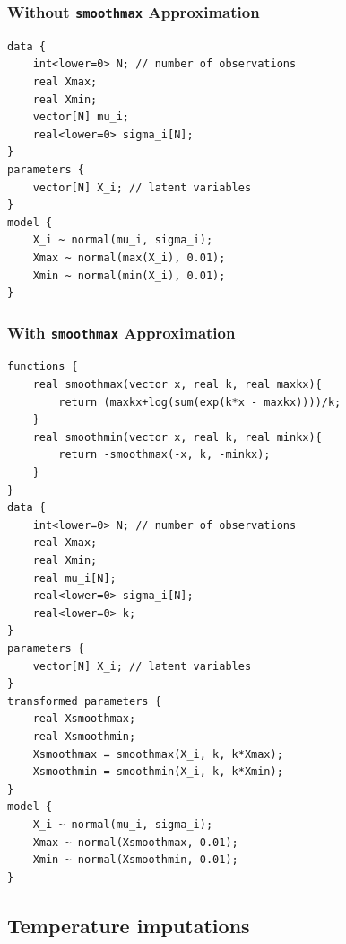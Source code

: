 \documentclass[letter]{article}
\begin{document}
\label{sec:stan_illustration}
        \subsubsection{\texorpdfstring{Without \texttt{smoothmax} Approximation}{Without smoothmax Approximation}}\label{without-smoothmax-approximation}
    


        \begin{verbatim}
data {
    int<lower=0> N; // number of observations
    real Xmax;
    real Xmin;
    vector[N] mu_i;
    real<lower=0> sigma_i[N];
}
parameters {
    vector[N] X_i; // latent variables
}
model {
    X_i ~ normal(mu_i, sigma_i);
    Xmax ~ normal(max(X_i), 0.01);
    Xmin ~ normal(min(X_i), 0.01);
}
\end{verbatim}
    


        \subsubsection{\texorpdfstring{With \texttt{smoothmax} Approximation}{With smoothmax Approximation}}\label{with-smoothmax-approximation}
    


        \begin{verbatim}
functions {
    real smoothmax(vector x, real k, real maxkx){
        return (maxkx+log(sum(exp(k*x - maxkx))))/k;
    }
    real smoothmin(vector x, real k, real minkx){
        return -smoothmax(-x, k, -minkx);
    }
}
data {
    int<lower=0> N; // number of observations
    real Xmax;
    real Xmin;
    real mu_i[N];
    real<lower=0> sigma_i[N];
    real<lower=0> k;
}
parameters {
    vector[N] X_i; // latent variables
}
transformed parameters {
    real Xsmoothmax;
    real Xsmoothmin;
    Xsmoothmax = smoothmax(X_i, k, k*Xmax);
    Xsmoothmin = smoothmin(X_i, k, k*Xmin);
}
model {
    X_i ~ normal(mu_i, sigma_i);
    Xmax ~ normal(Xsmoothmax, 0.01);
    Xmin ~ normal(Xsmoothmin, 0.01);
}
\end{verbatim}
    


        \subsection{Temperature imputations}\label{temperature-imputations}
    
\end{document}
